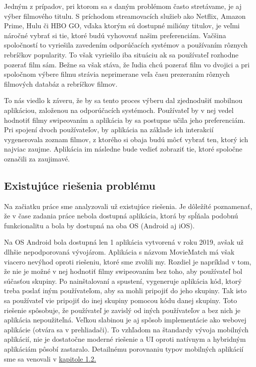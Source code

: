 Jedným z prípadov, pri ktorom sa s daným problémom často stretávame, je aj výber filmového titulu. S príchodom streamovacích služieb ako Netflix, Amazon Prime, Hulu či HBO GO, vďaka ktorým sú dostupné milióny titulov, je veľmi náročné vybrať si tie, ktoré budú vyhovovať našim preferenciám. Vačšina spoločností to vyriešila zavedením odporúčacích systémov a používaním rôznych rebríčkov popularity. To však vyriešilo iba situáciu ak sa používateľ rozhodne pozerať film sám. Bežne sa však stáva, že ľudia chcú pozerať film vo dvojici a pri spoločnom výbere filmu strávia neprimerane veľa času prezeraním rôznych filmových databáz a rebríčkov filmov. 

To nás viedlo k záveru, že by sa tento proces výberu dal zjednodušiť mobilnou aplikáciou, založenou na odporúčacích systémoch. Používateľ by v nej vedel hodnotiť filmy swipeovaním a aplikácia by sa postupne učila jeho preferenciám. Pri spojení dvoch používateľov, by aplikácia na základe ich interakcií vygenerovala zoznam filmov, z ktorého si obaja budú môcť vybrať ten, ktorý ich najviac zaujme. Aplikácia im následne bude vedieť zobraziť tie, ktoré spoločne označili za zaujimavé.



\subsection{Existujúce riešenia problému}
Na začiatku práce sme analyzovali už existujúce riešenia. Je dôležíté poznamenať, že v čase zadania práce nebola dostupná aplikácia, ktorá by spĺňala podobnú funkcionalitu a bola by dostupná na oba OS (Android aj iOS). 

Na OS Android bola dostupná len 1 aplikácia vytvorená v roku 2019, avšak už dlhšie nepodporovaná vývojárom. Aplikácia s názvom MovieMatch má však viacero nevýhod oproti riešeniu, ktoré sme zvolili my. Rozdiel je napríklad v tom, že nie je možné v nej hodnotiť filmy swipeovaním bez toho, aby používateľ bol súčasťou skupiny. Po nainštalovaní a spustení, vygeneruje aplikácia kód, ktorý treba poslať iným používateľom, aby sa mohli pripojiť do jeho skupiny. Tak isto sa používateľ vie pripojiť do inej skupiny pomocou kódu danej skupiny. Toto riešenie spôsobuje, že používateľ je zavislý od iných používateľov a bez nich je aplikácia nepoužiteľná. Veľkou slabinou je aj spôsob implementácie ako webovej aplikácie (otvára sa v prehliadači). To vzhľadom na štandardy vývoja mobilných aplikácií, nie je dostatočne moderné riešenie a UI oproti natívnym a hybridným aplikáciám pôsobí zastaralo. Detailnému porovnaniu typov mobilných aplikácií sme sa venovali v \hyperref[sec:typy aplikacii]{kapitole 1.2.} 

